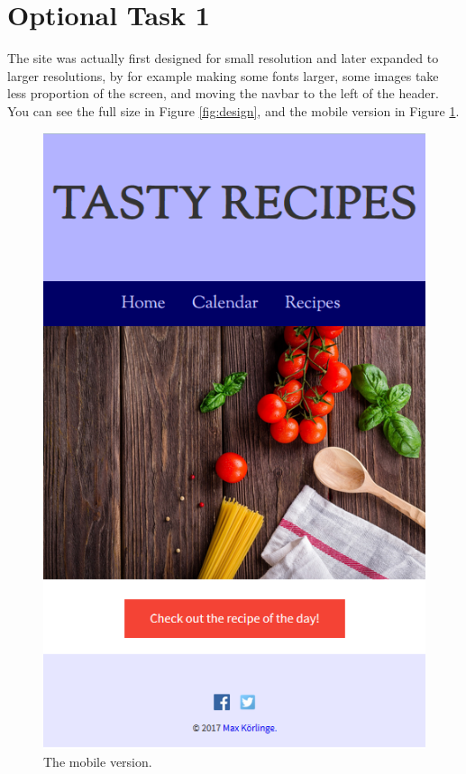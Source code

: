 \documentclass[a4paper]{scrreprt}
\begin{document}
\section{Optional Task 1}

The site was actually first designed for small resolution and later expanded to larger resolutions, by for example making some fonts larger, some images take less proportion of the screen, and moving the navbar to the left of the header. You can see the full size in Figure \ref{fig:design}, and the mobile version in Figure \ref{fig:mobversion}.

\begin{figure}[h!]
  \begin{center}
    \includegraphics[scale=0.41]{mobversion.png}
    \caption{The mobile version.}
    \label{fig:mobversion}
  \end{center}
\end{figure}
\end{document}
